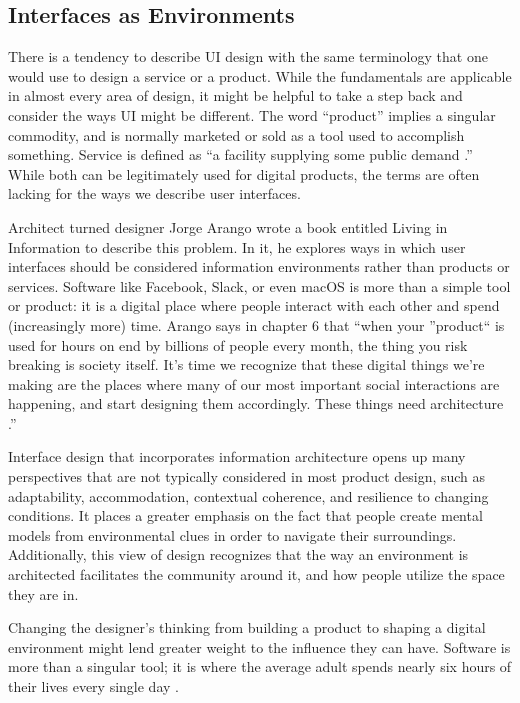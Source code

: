 \documentclass[12pt, oneside]{article}
\begin{document}
\subsection{Interfaces as Environments}

There is a tendency to describe UI design with the same terminology that one would use to design a service or a product. While the fundamentals are applicable in almost every area of design, it might be helpful to take a step back and consider the ways UI might be different. The word ``product'' implies a singular commodity, and is normally marketed or sold as a tool used to accomplish something. Service is defined as ``a facility supplying some public demand \cite{merriam-webster}.'' While both can be legitimately used for digital products, the terms are often lacking for the ways we describe user interfaces.

Architect turned designer Jorge Arango wrote a book entitled Living in Information to describe this problem. In it, he explores ways in which user interfaces should be considered information environments rather than products or services. Software like Facebook, Slack, or even macOS is more than a simple tool or product: it is a digital place where people interact with each other and spend (increasingly more) time. Arango says in chapter 6 that ``when your ''product`` is used for hours on end by billions of people every month, the thing you risk breaking is society itself. It’s time we recognize that these digital things we’re making are the places where many of our most important social interactions are happening, and start designing them accordingly. These things need architecture \cite{arango_2018}.''

Interface design that incorporates information architecture opens up many perspectives that are not typically considered in most product design, such as adaptability, accommodation, contextual coherence, and resilience to changing conditions. It places a greater emphasis on the fact that people create mental models from environmental clues in order to navigate their surroundings. Additionally, this view of design recognizes that the way an environment is architected facilitates the community around it, and how people utilize the space they are in.

Changing the designer's thinking from building a product to shaping a digital environment might lend greater weight to the influence they can have. Software is more than a singular tool; it is where the average adult spends nearly six hours of their lives every single day \cite{marvin_2018}.
\end{document}

